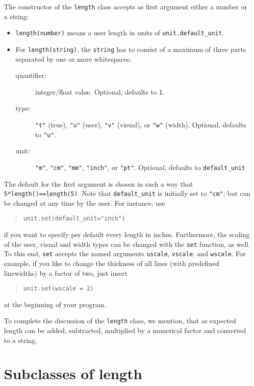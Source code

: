 The constructor of the \verb|length| class accepts as first argument
either a number or a string:
\begin{itemize}
\item \verb|length(number)| means a user length in units of \verb|unit.default_unit|.
\item For \verb|length(string)|, the \verb|string| has to consist of a
  maximum of three parts separated by one or more whitespaces:
\begin{description}
\item[quantifier:] integer/float value. Optional, defaults to \verb|1|.
\item[type:] \verb|"t"| (true), \verb|"u"| (user), \verb|"v"| (visual), or \verb|"w"| (width).
  Optional, defaults to \verb|"u"|.
\item[unit:] \verb|"m"|, \verb|"cm"|, \verb|"mm"|, \verb|"inch"|, or
  \verb|"pt"|. Optional, defaults to \verb|default_unit|
\end{description}
\end{itemize}
The default for the first argument is chosen in such a way that
\texttt{5*length()==length(5)}.  Note that \verb|default_unit| is
initially set to \verb|"cm"|, but can be changed at any time by the
user. For instance, use
\begin{quote}
\begin{verbatim}
unit.set(default_unit="inch")
\end{verbatim}
\end{quote}
if you want to specify per default every length in inches.
Furthermore, the scaling of the user, visual and width types can be
changed with the \verb|set| function, as well. To this end, \verb|set|
accepts the named arguments \verb|uscale|, \verb|vscale|, and
\verb|wscale|. For example, if you like to change the thickness of all
lines (with predefined linewidths) by a factor of two, just insert
\begin{quote}
\begin{verbatim}
unit.set(wscale = 2)
\end{verbatim}
\end{quote}
at the beginning of your program.

To complete the discussion of the \verb|length| class, we mention,
that as expected \PyX{} length can be added, subtracted, multiplied by
a numerical factor and converted to a string.

\section{Subclasses of length}

